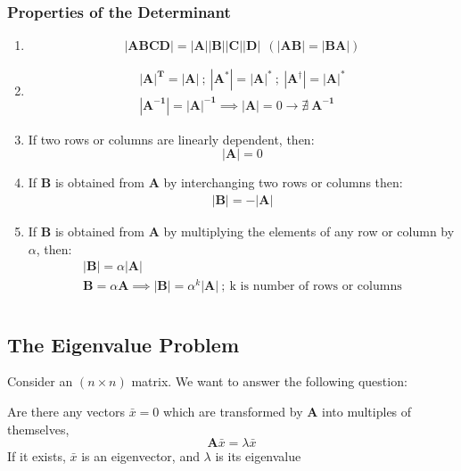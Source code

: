 \documentclass[a4paper, 11pt, normalem]{report}
\begin{document}
\subsection{Properties of the Determinant}
\begin{enumerate}
    \item $$\mathbf{|ABCD|} = \mathbf{|A||B||C||D|} ~~ (\mathbf{|AB|} = \mathbf{|BA|})$$
    \item   \begin{gather*}
                \mathbf{|A|^T} = \mathbf{|A|} ~;~ \mathbf{|A^{*}|} = \mathbf{|A|^*} ~;~ \mathbf{|A^{\dagger}|} = \mathbf{|A|^*} \\
                \mathbf{|A^{-1}|} = \mathbf{|A|^{-1}} \implies \mathbf{|A|} = 0 \to \nexists~ \mathbf{A^{-1}}
            \end{gather*}
    \item If two rows or columns are linearly dependent, then: $$\mathbf{|A|} = 0$$
    \item If $\mathbf{B}$ is obtained from $\mathbf{A}$ by interchanging two rows or columns then:
            \begin{gather*}
                \mathbf{|B|} = -\mathbf{|A|}
            \end{gather*}
    \item If $\mathbf{B}$ is obtained from $\mathbf{A}$ by multiplying the elements of any row or column by $\alpha$, then:
            \begin{gather*}
                \mathbf{|B|} = \alpha\mathbf{|A|} \\
                \mathbf{B} = \alpha\mathbf{A} \implies \mathbf{|B|} = \alpha^k \mathbf{|A|} ~;~ \text{k is number of rows or columns}
            \end{gather*}
\end{enumerate}

\chapter{}
\section{The Eigenvalue Problem}
Consider an $(n \times n)$ matrix. We want to answer the following question:

Are there any vectors $\bar{x} = 0$ which are transformed by $\mathbf{A}$ into multiples of themselves,
\begin{equation*}
    \mathbf{A}\bar{x} = \lambda\bar{x}
\end{equation*}
If it exists, $\bar{x}$ is an eigenvector, and $\lambda$ is its eigenvalue
\end{document}
